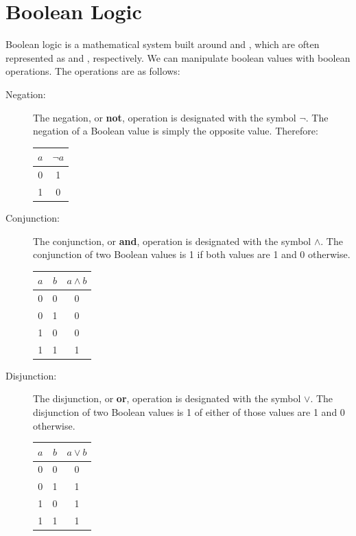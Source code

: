 \documentclass[letterpaper]{article}
\begin{document}
\newpage 
\section{Boolean Logic}
Boolean logic is a mathematical system built around  and , which are often represented as  and , respectively. We can manipulate boolean values with boolean operations. The operations are as follows:
\begin{description}
    \item[Negation:] The negation, or \textbf{not}, operation is designated with the symbol $\neg$. The negation of a Boolean value is simply the opposite value. Therefore: 
    \begin{center}
        \begin{tabular}{c|c}
            $a$ & $\neg a$ \\ 
            \hline 
            0 & 1 \\ 
            1 & 0
        \end{tabular}
    \end{center}
    
    \item[Conjunction:] The conjunction, or \textbf{and}, operation is designated with the symbol $\land$. The conjunction of two Boolean values is 1 if both values are 1 and 0 otherwise.
    \begin{center}
        \begin{tabular}{c c|c}
            $a$ & $b$ & $a \land b$ \\ 
            \hline 
            0 & 0 & 0 \\ 
            0 & 1 & 0 \\ 
            1 & 0 & 0 \\ 
            1 & 1 & 1
        \end{tabular}
    \end{center}

    \item[Disjunction:] The disjunction, or \textbf{or}, operation is designated with the symbol $\lor$. The disjunction of two Boolean values is 1 of either of those values are 1 and 0 otherwise.   
    \begin{center}
        \begin{tabular}{c c|c}
            $a$ & $b$ & $a \lor b$ \\ 
            \hline 
            0 & 0 & 0 \\ 
            0 & 1 & 1 \\ 
            1 & 0 & 1 \\ 
            1 & 1 & 1
        \end{tabular}
    \end{center} 
\end{description}
\end{document}
